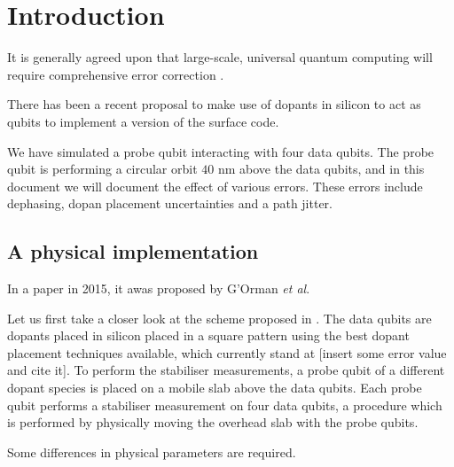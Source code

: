 
\section{Introduction} \label{sec:Introduction}
It is generally agreed upon that large-scale, universal quantum computing will require comprehensive error correction \cite{Wang2011,Fowler2012}.




There has been a recent proposal to make use of dopants in silicon to act as qubits \cite{the paper} to implement a version of the surface code. 


We have simulated a probe qubit interacting with four data qubits. The probe qubit is performing a circular orbit $40$ nm above the data qubits, and in this document we will document the effect of various errors. These errors include dephasing, dopan placement uncertainties and a path jitter. 

\subsection{A physical implementation}
In a paper in 2015, it awas proposed by G'Orman \textit{et al}. 

Let us first take a closer look at the scheme proposed in \cite{the paper}. The data qubits are dopants placed in silicon placed in a square pattern using the best dopant placement techniques available, which currently stand at [insert some error value and cite it]. To perform the stabiliser measurements, a probe qubit of a different dopant species is placed on a mobile slab above the data qubits. Each probe qubit performs a stabiliser measurement on four data qubits, a procedure which is performed by physically moving the overhead slab with the probe qubits. 

Some differences in physical parameters are required. 


\begin{figure}[H]
	\centering
	\\
	\caption[oddeven]{}
	\label{FIG:paper}
\end{figure}